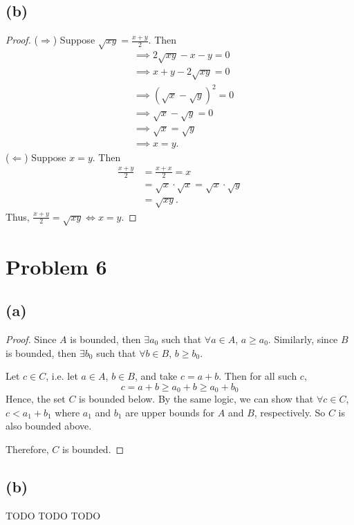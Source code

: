 \documentclass{article}
\begin{document}
\subsection*{(b)}
\begin{proof}
	($\Rightarrow$) Suppose $\sqrt{xy} = \frac{x+y}{2}$. Then
	\begin{align}
		&\implies 2\sqrt{xy} - x - y = 0 \\
		&\implies x + y - 2\sqrt{xy} = 0 \\
		&\implies \left(\sqrt{x} - \sqrt{y}\right)^2 = 0 \\
		&\implies \sqrt{x} - \sqrt{y} = 0 \\
		&\implies \sqrt{x} = \sqrt{y} \\
		&\implies x = y.
	\end{align}
	($\Leftarrow$) Suppose $x=y$. Then
	\begin{align}
		\frac{x+y}{2} &= \frac{x+x}{2} = x \\
		&= \sqrt{x}\cdot \sqrt{x} = \sqrt{x}\cdot \sqrt{y}\\
		&= \sqrt{xy}.
	\end{align}
	Thus, $\frac{x+y}{2}=\sqrt{xy} \iff x=y$.
\end{proof}

\section*{Problem 6}
\subsection*{(a)}
\begin{proof}
	Since $A$ is bounded, then $\exists a_0$ such that $\forall a \in A$, $a \geq a_0$. Similarly, since $B$ is bounded, then $\exists b_0$ such that $\forall b \in B$, $b \geq b_0$. 
	
	Let $c\in C$, i.e. let $a\in A$, $b\in B$, and take $c = a + b$. Then for all such $c$, 
	\begin{equation}
		c = a + b \geq a_0 + b \geq a_0 + b_0
	\end{equation}
	Hence, the set $C$ is bounded below. By the same logic, we can show that $\forall c\in C$, $c<a_1 + b_1$ where $a_1$ and $b_1$ are upper bounds for $A$ and $B$, respectively. So $C$ is also bounded above.
	
	Therefore, $C$ is bounded.
\end{proof}

\subsection*{(b)}
TODO TODO TODO
\end{document}
